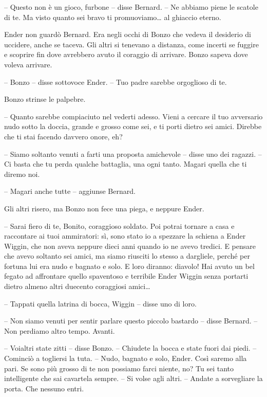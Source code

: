 {-- Questo non è un gioco, furbone -- disse Bernard. -- Ne abbiamo piene
	le scatole di te. Ma visto quanto sei bravo ti promuoviamo\ldots{} al
	ghiaccio eterno.}

{Ender non guardò Bernard. Era negli occhi di Bonzo che vedeva il
	desiderio di uccidere, anche se taceva. Gli altri si tenevano a
	distanza, come incerti se fuggire e scoprire fin dove avrebbero avuto il
	coraggio di arrivare. Bonzo sapeva dove voleva arrivare.}

{-- Bonzo -- disse sottovoce Ender. -- Tuo padre sarebbe orgoglioso di
	te.}

{Bonzo strinse le palpebre.}

{-- Quanto sarebbe compiaciuto nel vederti adesso. Vieni a cercare il
	tuo avversario nudo sotto la doccia, grande e grosso come sei, e ti
	porti dietro sei amici. Direbbe che ti stai facendo davvero onore, eh?}

{-- Siamo soltanto venuti a farti una proposta amichevole -- disse uno
	dei ragazzi. -- Ci basta che tu perda qualche battaglia, una ogni tanto.
	Magari quella che ti diremo noi.}

{-- Magari anche tutte -- aggiunse Bernard.}

{Gli altri risero, ma Bonzo non fece una piega, e neppure Ender.}

{-- Sarai fiero di te, Bonito, coraggioso soldato. Poi potrai tornare a
	casa e raccontare ai tuoi ammiratori: sì, sono stato io a spezzare la
	schiena a Ender Wiggin, che non aveva neppure dieci anni quando io ne
	avevo tredici. E pensare che avevo soltanto sei amici, ma siamo riusciti
	lo stesso a dargliele, perché per fortuna lui era nudo e bagnato e solo.
	E loro diranno: diavolo! Hai avuto un bel fegato ad affrontare quello
	spaventoso e terribile Ender Wiggin senza portarti dietro almeno altri
	duecento coraggiosi amici\ldots{}}

{-- Tappati quella latrina di bocca, Wiggin -- disse uno di loro.}

{-- Non siamo venuti per sentir parlare questo piccolo bastardo -- disse
	Bernard. -- Non perdiamo altro tempo. Avanti.}

{-- Voialtri state zitti -- disse Bonzo. -- Chiudete la bocca e state
	fuori dai piedi. -- Cominciò a togliersi la tuta. -- Nudo, bagnato e
	solo, Ender. Così saremo alla pari. Se sono più grosso di te non
	possiamo farci niente, no? Tu sei tanto intelligente che sai cavartela
	sempre. -- Si volse agli altri. -- Andate a sorvegliare la porta. Che
	nessuno entri.}

